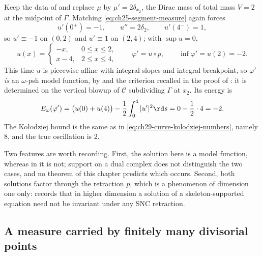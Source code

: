 \begin{example}
\label{ex:ch29-curve-dirac}
Keep the data of  and replace \(\mu\) by
\(\mu'=2\delta_{x_2}\), the Dirac mass of total mass \(V=2\) at the midpoint
of \(\Gamma\).  Matching \eqref{eq:ch25-segment-measure} again forces
\[
 u'(0^+)=-1,\qquad u''=2\delta_2,\qquad u'(4^-)=1 ,
\]
so \(u'\equiv-1\) on \((0,2)\) and \(u'\equiv1\) on \((2,4)\); with
\(\sup u=0\),
\begin{equation}
\label{eq:ch29-curve-dirac-solution}
 u(x)=\begin{cases}-x,&0\leq x\leq2,\\ x-4,&2\leq x\leq4,\end{cases}
 \qquad
 \varphi'=u\circ p,
 \qquad \inf\varphi'=u(2)=-2 .
\end{equation}
This time \(u\) is piecewise affine with integral slopes and integral
breakpoint, so \(\varphi'\) \emph{is} an \(\omega\)-psh model function, by
 and the criterion recalled in the proof of
: it is determined on the vertical
blowup of \(\mathcal C\) subdividing \(\Gamma\) at \(x_2\).  Its energy is
\[
 E_\omega(\varphi')
 =\bigl(u(0)+u(4)\bigr)-\frac12\int_0^4|u'|^2\rd s
 =0-\frac12\cdot4=-2 .
\]
The Ko\l odziej bound is the same as in
\eqref{eq:ch29-curve-kolodziej-numbers}, namely \(8\), and the true
oscillation is \(2\).

Two features are worth recording.  First, the solution here is a model
function, whereas in  it is not; support on a
dual complex does not distinguish the two cases, and no theorem of this
chapter predicts which occurs.  Second, both solutions factor through the
retraction \(p\), which is a phenomenon of dimension one only:
 records that in higher dimension a
solution of a skeleton-supported equation need not be invariant under any
SNC retraction.
\end{example}

\subsection{A measure carried by finitely many divisorial points}
\label{sec:ch29-ex-divisorial}

